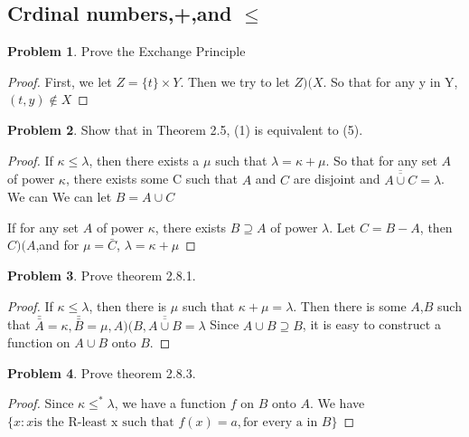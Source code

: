 \documentclass[a4paper,11pt]{article}%
\theoremstyle{remark}
\theoremstyle{definition}
\newtheorem{problem}{Problem}[subsection]
\begin{document}
\subsection{Crdinal numbers,+,and $\leq$}
\begin{problem}
    Prove the Exchange Principle
    \begin{proof}
        First, we let $Z=\{t\}\times Y$.
        Then we try to let $Z)(X$.
        So that for any y in Y,$(t,y)\notin X$
    \end{proof}
\end{problem}
\begin{problem}
    Show that in Theorem 2.5, (1) is equivalent to (5).
\begin{proof}
   If  $\kappa\leq\lambda$, then there exists a $\mu$ such that $\lambda=\kappa+\mu$.
    So that for any set $A$ of power $\kappa$, there exists some C such that $A$
    and $C$ are disjoint and $\overline{\overline{A\cup C}}=\lambda$. We can
    We can let $B=A\cup C$

    If for any set $A$ of power $\kappa$, there exists $B\supseteq A$ of power $\lambda$.
    Let $C=B-A$, then $C)(A$,and for $\mu=\bar{C}$, $\lambda=\kappa+\mu$
\end{proof}
\end{problem}
\begin{problem}
    Prove theorem 2.8.1.
    \begin{proof}
        If $\kappa\leq\lambda$, then there is $\mu$ such that $\kappa+\mu=\lambda$.
        Then there is some $A$,$B$ such that $\bar{\bar{A}}=\kappa,\bar{\bar{B}}=\mu,A)(B,\overline{\overline{A\cup B}}=\lambda$
        Since $A\cup B\supseteq B$, it is easy to construct a function on $A\cup B$ onto $B$.
    \end{proof}
\end{problem}
\begin{problem}
    Prove theorem 2.8.3.
    \begin{proof}
        Since $\kappa\leq^*\lambda$, we have a function $f$ on $B$ onto $A$.
        We have $\{x:x \text{is the R-least x such that }f(x)=a, \text{for every a in }B \}$
    \end{proof}
\end{problem}
\end{document}
